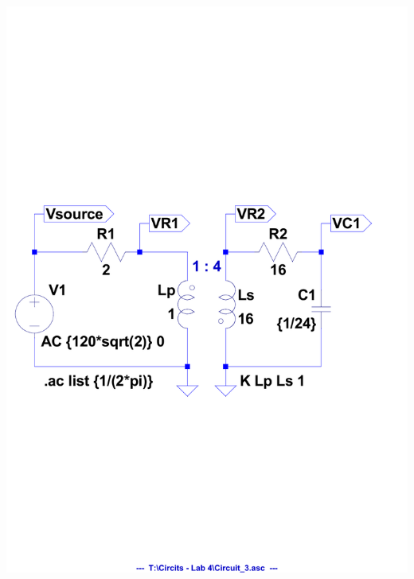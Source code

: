 \documentclass[journal]{IEEEtran}
\begin{document}
\begingroup
    \centering
    \medskip
    \includegraphics[clip, trim=0.0cm 9cm 0.0cm 9cm, width=\columnwidth]{images/labx_6.pdf}
    \label{fig:circuit3}
    \medskip
\endgroup
\end{document}
